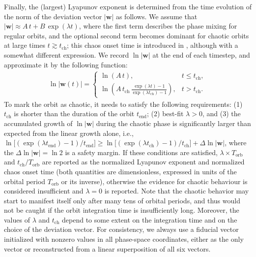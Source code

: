 \documentclass[12pt]{article}
\begin{document}
Finally, the (largest) Lyapunov exponent is determined from the time evolution of the norm of the deviation vector $|\boldsymbol{w}|$ as follows. We assume that $|\boldsymbol w| \approx A\,t + B\,\exp(\lambda t)$, where the first term describes the phase mixing for regular orbits, and the optional second term becomes dominant for chaotic orbits at large times $t\gtrsim t_\mathrm{ch}$; this chaos onset time is introduced in \cite{Woudenberg2025}, although with a somewhat different expression. We record $\ln|\boldsymbol w|$ at the end of each timestep, and approximate it by the following function:
\begin{align}  \label{eq:lyapunov}
\ln |\boldsymbol w(t)| = \left\{ \begin{array}{ll}
  \ln (A\,t), & t \le t_\mathrm{ch}, \\
  \displaystyle \ln \left(A\,t_\mathrm{ch}\, \frac{\exp(\lambda t) - 1}{\exp(\lambda t_\mathrm{ch}) - 1}\right), & t > t_\mathrm{ch}.
\end{array} \right.
\end{align}
To mark the orbit as chaotic, it needs to satisfy the following requirements: (1) $t_\mathrm{ch}$ is shorter than the duration of the orbit $t_\mathrm{end}$; (2) best-fit $\lambda>0$, and (3) the accumulated growth of $\ln|\boldsymbol w|$ during the chaotic phase is significantly larger than expected from the linear growth alone, i.e., $\ln\big[(\exp(\lambda t_\mathrm{end})-1) / t_\mathrm{end}\big] \ge \ln\big[(\exp(\lambda t_\mathrm{ch})-1) / t_\mathrm{ch}\big] + \Delta\ln|\boldsymbol w|$, where the $\Delta\ln|\boldsymbol w|=\ln 2$ is a safety margin. If these conditions are satisfied, $\lambda \times T_\mathrm{orb}$ and $t_\mathrm{ch} / T_\mathrm{orb}$ are reported as the normalized Lyapunov exponent and normalized chaos onset time (both quantities are dimensionless, expressed in units of the orbital period $T_\mathrm{orb}$ or its inverse), otherwise the evidence for chaotic behaviour is considered insufficient and $\lambda=0$ is reported. Note that the chaotic behavior may start to manifest itself only after many tens of orbital periods, and thus would not be caught if the orbit integration time is insufficiently long. Moreover, the values of $\lambda$ and $t_\mathrm{ch}$ depend to some extent on the integration time and on the choice of the deviation vector. For consistency, we always use a fiducial vector initialized with nonzero values in all phase-space coordinates, either as the only vector or reconstructed from a linear superposition of all six vectors.
\end{document}
